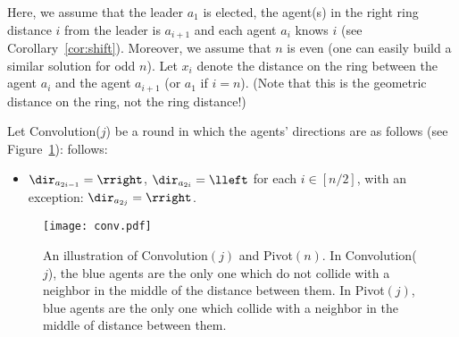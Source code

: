 Here, we assume that the leader $a_1$ is elected, the agent(s) in the right ring distance
$i$ from the leader is $a_{i+1}$ and each agent $a_i$ knows $i$ (see Corollary~\ref{cor:shift}). Moreover, we assume that
$n$ is even (one can easily build a similar solution for odd $n$).
Let $x_i$ denote the distance on the ring between the agent $a_i$ and the agent $a_{i+1}$
(or $a_1$ if $i=n$). (Note that this is the geometric distance on the ring, not the ring distance!)


Let Convolution($j$) be a round in which the agents' directions are as 
\iffull
follows (see Figure~\ref{fig:red:strong}):
\else
follows:
\fi
\begin{itemize}
\item[]
$\dir_{a_{2i-1}}=\rright$, $\dir_{a_{2i}}=\lleft$ for each $i\in[n/2]$, with an
exception: $\dir_{a_{2j}}=\rright$.
\end{itemize}
\iffull
\begin{figure}[H]
\begin{center}
\texttt{[image: conv.pdf]}
  \caption{An illustration of Convolution$(j)$ and Pivot$(n)$. In Convolution($j$), the blue agents are the only one which do not collide with a neighbor in the middle of the distance between them. In Pivot$(j)$, blue agents are the only one which collide with a neighbor in the middle of distance between them.}
\label{fig:red:strong}
\end{center}
\end{figure}
\else
\fi

